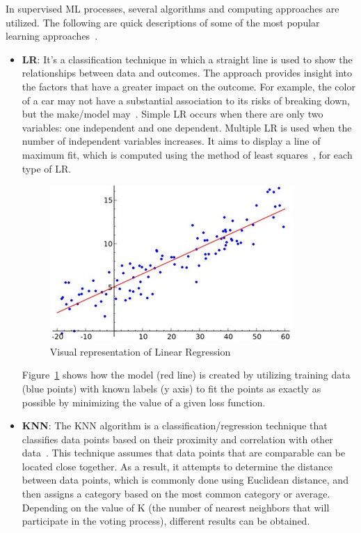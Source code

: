 In supervised \gls{ML} processes, several algorithms and computing approaches are utilized. The following are quick descriptions of some of the most popular learning approaches~\cite{2020WhatIBM,Chugh2018TypesKnow}.
\begin{itemize}
    \item \textbf{\gls{LR}}: It's a classification technique in which a straight line is used to show the relationships between data and outcomes. The approach provides insight into the factors that have a greater impact on the outcome. For example, the color of a car may not have a substantial association to its risks of breaking down, but the make/model may~\cite{Chugh2018TypesKnow}. Simple \gls{LR} occurs when there are only two variables: one independent and one dependent. Multiple \gls{LR} is used when the number of independent variables increases. It aims to display a line of maximum fit, which is computed using the method of least squares~\cite{Kenton2021LeastDefinition}, for each type of \gls{LR}.
    
    \begin{figure}[htbp]
        \centering
        \includegraphics[width=0.65\linewidth]{Chapters/Figures/linear_regression.jpg}
        \caption{Visual representation of Linear Regression~\cite{MachineRegressionModel}}
        \label{fig:linear_regression}
    \end{figure}
    
    Figure~\ref{fig:linear_regression} shows how the model (red line) is created by utilizing training data (blue points) with known labels (y axis) to fit the points as exactly as possible by minimizing the value of a given loss function.
    
    \item \textbf{\gls{KNN}}:
    The \gls{KNN} algorithm is a classification/regression technique that classifies data points based on their proximity and correlation with other data~\cite{Singh2018K-NearestPython,2020WhatIBM}. This technique assumes that data points that are comparable can be located close together. As a result, it attempts to determine the distance between data points, which is commonly done using Euclidean distance, and then assigns a category based on the most common category or average. Depending on the value of K (the number of nearest neighbors that will participate in the voting process), different results can be obtained.
    

\end{itemize}

